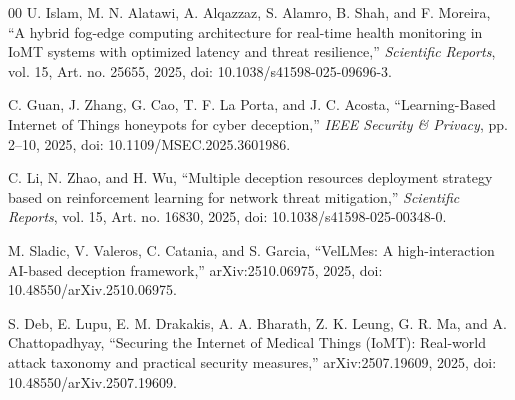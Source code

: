 \documentclass[conference, a4paper]{IEEEtran}
\begin{document}
\begin{thebibliography}{00}
U. Islam, M. N. Alatawi, A. Alqazzaz, S. Alamro, B. Shah, and F. Moreira, ``A hybrid fog-edge computing architecture for real-time health monitoring in IoMT systems with optimized latency and threat resilience,'' \textit{Scientific Reports}, vol. 15, Art. no. 25655, 2025, doi: 10.1038/s41598-025-09696-3.

C. Guan, J. Zhang, G. Cao, T. F. La Porta, and J. C. Acosta, ``Learning-Based Internet of Things honeypots for cyber deception,'' \textit{IEEE Security \& Privacy}, pp. 2--10, 2025, doi: 10.1109/MSEC.2025.3601986.

C. Li, N. Zhao, and H. Wu, ``Multiple deception resources deployment strategy based on reinforcement learning for network threat mitigation,'' \textit{Scientific Reports}, vol. 15, Art. no. 16830, 2025, doi: 10.1038/s41598-025-00348-0.

M. Sladic, V. Valeros, C. Catania, and S. Garcia, ``VelLMes: A high-interaction AI-based deception framework,'' arXiv:2510.06975, 2025, doi: 10.48550/arXiv.2510.06975.

S. Deb, E. Lupu, E. M. Drakakis, A. A. Bharath, Z. K. Leung, G. R. Ma, and A. Chattopadhyay, ``Securing the Internet of Medical Things (IoMT): Real-world attack taxonomy and practical security measures,'' arXiv:2507.19609, 2025, doi: 10.48550/arXiv.2507.19609.

\end{thebibliography}
\end{document}
